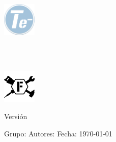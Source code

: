 



\centering
\includegraphics[width=0.12\textwidth]{./img/telectric_logo.png}
  \begin{minipage}[b][3\baselineskip][t]{21em}
    \centering
    \small
    \tipo\\
    \clase\\
    \subclase
  \end{minipage}
 \includegraphics[width=0.12\textwidth]{./img/factores_logo.png}
  

    \LARGE
   	\begin{spacing}{1}
   	
	\titulo
	\linebreak
	
	\end{spacing}
	
	\normalsize
	
	Versión \textit{\version}
	\linebreak
	\textit{\comentario}
	\linebreak
	
	\begin{flushleft}
	\normalsize{Grupo: \grupo}
	\linebreak	
	\linebreak
	\normalsize{Autores: \autor}
	\linebreak	
	\linebreak
	Fecha: \today
	\vfill
	\end{flushleft}
	




